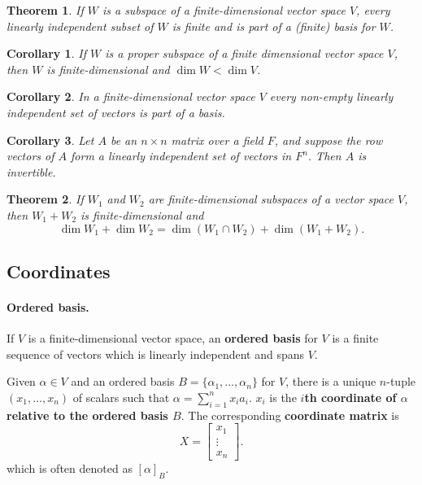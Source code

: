\documentclass{article}
\newtheorem{theorem}{Theorem}
\newtheorem{corollary}{Corollary}
\begin{document}
\begin{theorem}
  If $W$ is a subspace of a finite-dimensional vector space $V$, every linearly
  independent subset of $W$ is finite and is part of a (finite) basis for $W$.
\end{theorem}

\setcounter{corollary}{0}
\begin{corollary}
  If $W$ is a proper subspace of a finite dimensional vector space $V$, then
  $W$ is finite-dimensional and $\dim W < \dim V$.
\end{corollary}

\begin{corollary}
  In a finite-dimensional vector space $V$ every non-empty linearly independent
  set of vectors is part of a basis.
\end{corollary}

\begin{corollary}
  Let $A$ be an $n \times n$ matrix over a field $F$, and suppose the row
  vectors of $A$ form a linearly independent set of vectors in $F^n$. Then $A$
  is invertible.
\end{corollary}

\begin{theorem}
  If $W_1$ and $W_2$ are finite-dimensional subspaces of a vector space $V$,
  then $W_1 + W_2$ is finite-dimensional and \[
    \dim W_1 + \dim W_2 = \dim (W_1 \cap W_2) + \dim (W_1 + W_2).
  \]
\end{theorem}

\subsection{Coordinates}

\paragraph{Ordered basis.} If $V$ is a finite-dimensional vector space, an
\textbf{ordered basis} for $V$ is a finite sequence of vectors which is linearly
independent and spans $V$.

Given $\alpha \in V$ and an ordered basis $B = \{\alpha_1, \ldots, \alpha_n\}$
for $V$, there is a unique $n$-tuple $(x_1, \ldots, x_n)$ of scalars such that
$\alpha = \sum_{i=1}^n x_ia_i$. $x_i$ is the \textbf{$i$th coordinate of
$\alpha$ relative to the ordered basis $B$}. The corresponding
\textbf{coordinate matrix} is \[
  X = \begin{bmatrix}
    x_1 \\
    \vdots \\
    x_n
  \end{bmatrix}.
\] which is often denoted as $[\alpha]_B$.
\end{document}
